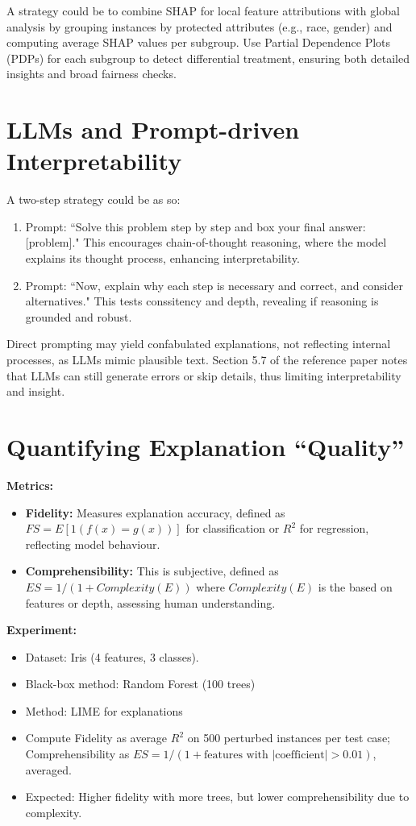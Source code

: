 \documentclass{article}
\theoremstyle{mytheoremstyle}
\theoremstyle{mytheoremstyle}
\theoremstyle{myproblemstyle}
\begin{document}
A strategy could be to combine SHAP for local feature attributions with global analysis by grouping instances by protected attributes (e.g., race, gender) and computing average SHAP values per subgroup. Use Partial Dependence Plots (PDPs) for each subgroup to detect differential treatment, ensuring both detailed insights and broad fairness checks.

\section{LLMs and Prompt-driven Interpretability}
A two-step strategy could be as so:
\begin{enumerate}
    \item Prompt: ``Solve this problem step by step and box your final answer: [problem]." This encourages chain-of-thought reasoning, where the model explains its thought process, enhancing interpretability.
    \item Prompt: ``Now, explain why each step is necessary and correct, and consider alternatives." This tests conssitency and depth, revealing if reasoning is grounded and robust.
\end{enumerate}
Direct prompting may yield confabulated explanations, not reflecting internal processes, as LLMs mimic plausible text. Section 5.7 of the reference paper \cite{refpaper} notes that LLMs can still generate errors or skip details, thus limiting interpretability and insight. 

\section{Quantifying Explanation ``Quality''}
\textbf{Metrics:}
\begin{itemize}
    \item \textbf{Fidelity:} Measures explanation accuracy, defined as $ FS = E[1(f(x) = g(x))] $ for classification or $ R^2 $ for regression, reflecting model behaviour.
    \item \textbf{Comprehensibility:} This is subjective, defined as $ ES = 1/(1 + Complexity(E)) $ where $ Complexity(E) $ is the based on features or depth, assessing human understanding. 
\end{itemize}

\textbf{Experiment:}
\begin{itemize}
    \item Dataset: Iris (4 features, 3 classes).
    \item Black-box method: Random Forest (100 trees)
    \item Method: LIME for explanations
    \item Compute Fidelity as average $R^2$ on 500 perturbed instances per test case; Comprehensibility as $ ES = 1/(1 + \text{features with |coefficient|} > 0.01) $, averaged. 
    \item Expected: Higher fidelity with more trees, but lower comprehensibility due to complexity.
\end{itemize}
\end{document}
